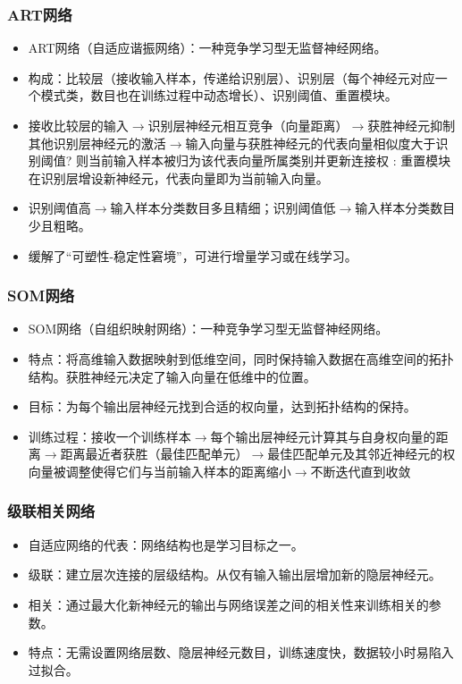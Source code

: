 \documentclass{ctexart}
\begin{document}
					\subsubsection{ART网络}
						\begin{itemize}
							\item ART网络（自适应谐振网络）：一种竞争学习型无监督神经网络。
							\item 构成：比较层（接收输入样本，传递给识别层）、识别层（每个神经元对应一个模式类，数目也在训练过程中动态增长）、识别阈值、重置模块。
							\item 接收比较层的输入$\rightarrow$识别层神经元相互竞争（向量距离）$\rightarrow$获胜神经元抑制其他识别层神经元的激活$\rightarrow$输入向量与获胜神经元的代表向量相似度大于识别阈值? 则当前输入样本被归为该代表向量所属类别并更新连接权 : 重置模块在识别层增设新神经元，代表向量即为当前输入向量。
							\item 识别阈值高$\rightarrow$输入样本分类数目多且精细；识别阈值低$\rightarrow$输入样本分类数目少且粗略。
							\item 缓解了``可塑性-稳定性窘境''，可进行增量学习或在线学习。
						\end{itemize}
					\subsubsection{SOM网络}
						\begin{itemize}
							\item SOM网络（自组织映射网络）：一种竞争学习型无监督神经网络。
							\item 特点：将高维输入数据映射到低维空间，同时保持输入数据在高维空间的拓扑结构。获胜神经元决定了输入向量在低维中的位置。
							\item 目标：为每个输出层神经元找到合适的权向量，达到拓扑结构的保持。
							\item 训练过程：接收一个训练样本$\rightarrow$每个输出层神经元计算其与自身权向量的距离$\rightarrow$距离最近者获胜（最佳匹配单元）$\rightarrow$最佳匹配单元及其邻近神经元的权向量被调整使得它们与当前输入样本的距离缩小$\rightarrow$不断迭代直到收敛
						\end{itemize}
					\subsubsection{级联相关网络}
						\begin{itemize}
							\item 自适应网络的代表：网络结构也是学习目标之一。
							\item 级联：建立层次连接的层级结构。从仅有输入输出层增加新的隐层神经元。
							\item 相关：通过最大化新神经元的输出与网络误差之间的相关性来训练相关的参数。
							\item 特点：无需设置网络层数、隐层神经元数目，训练速度快，数据较小时易陷入过拟合。
						\end{itemize}
\end{document}
